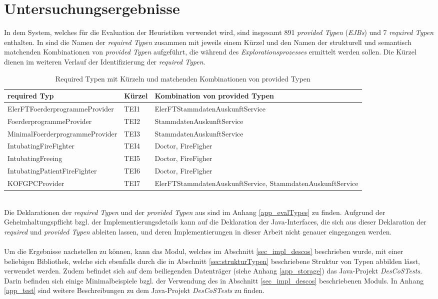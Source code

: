 \chapter{Untersuchungsergebnisse}\label{chap_evaluation}
In dem System, welches für die Evaluation der \Gls{Heuristik}en verwendet wird, sind insgesamt 891 \emph{provided Typen} (\emph{EJBs}) und 7 \emph{required Typen} enthalten. In  sind die Namen der \emph{required Typen} zusammen mit jeweils einem Kürzel und den Namen der strukturell und semantisch matchenden Kombinationen von \emph{provided Typen} aufgeführt, die während des \emph{Explorationsprozesses} ermittelt werden sollen. Die Kürzel dienen im weiteren Verlauf der Identifizierung der \emph{required Typen}.
\begin{table}[h!]
\centering
\small
\begin{tabular}{|p{6cm}|p{1.5cm}|p{6.5cm}|}
\hline
\hline
\centering\textbf{required Typ} & \textbf{Kürzel} & \textbf{Kombination von provided Typen}\\
\hline
\hline
ElerFTFoerderprogrammeProvider & TEI1 & ElerFTStammdatenAuskunftService\\
\hline
FoerderprogrammeProvider & TEI2 & StammdatenAuskunftService\\
\hline
MinimalFoerderprogrammeProvider & TEI3 & StammdatenAuskunftService\\
\hline
IntubatingFireFighter & TEI4 & Doctor, FireFigher\\
\hline
IntubatingFreeing & TEI5 & Doctor, FireFigher\\
\hline
IntubatingPatientFireFighter & TEI6 & Doctor, FireFigher\\
\hline
KOFGPCProvider & TEI7 & ElerFTStammdatenAuskunftService, StammdatenAuskunftService\\
\hline
\hline
\end{tabular}
\caption{Required Typen mit Kürzeln und matchenden Kombinationen von provided Typen}
 \label{tab:eIShort}
\end{table}
\noindent
\\
Die Deklarationen der \emph{required Typen} und der \emph{provided Typen} aus  sind im Anhang \ref{app_evalTypes} zu finden. Aufgrund der Geheimhaltungspflicht bzgl. der Implementierungsdetails kann auf die Deklaration der Java-Interfaces, die sich aus dieser Deklaration der \emph{required} und \emph{provided Typen} ableiten lassen, und deren Implementierungen in dieser Arbeit nicht genauer eingegangen werden.
\\\\
Um die Ergebnisse nachstellen zu können, kann das \Gls{Modul}, welches im Abschnitt \ref{sec_impl_descos} beschrieben wurde, mit einer beliebigen Bibliothek, welche sich ebenfalls durch die in Abschnitt \ref{sec:strukturTypen} beschriebene Struktur von Typen abbilden lässt, verwendet werden. Zudem befindet sich auf dem beiliegenden Datenträger (siehe Anhang \ref{app_storage}) das Java-Projekt \emph{DesCoSTests}. Darin befinden sich einige Minimalbeispiele bzgl. der Verwendung des in Abschnitt \ref{sec_impl_descos} beschriebenen \Gls{Modul}s. In Anhang \ref{app_test} sind weitere Beschreibungen zu dem Java-Projekt \emph{DesCoSTests} zu finden.

